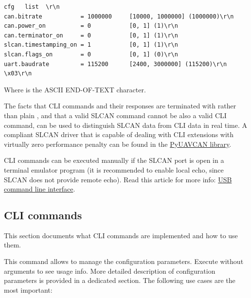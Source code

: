 \documentclass{zubaxdoc}
\begin{document}
\begin{verbatim}
cfg   list  \r\n
can.bitrate           = 1000000     [10000, 1000000] (1000000)\r\n
can.power_on          = 0           [0, 1] (1)\r\n
can.terminator_on     = 0           [0, 1] (1)\r\n
slcan.timestamping_on = 1           [0, 1] (1)\r\n
slcan.flags_on        = 0           [0, 1] (0)\r\n
uart.baudrate         = 115200      [2400, 3000000] (115200)\r\n
\x03\r\n
\end{verbatim}

Where  is the ASCII END-OF-TEXT character.

The facts that CLI commands and their responses are terminated with  rather than plain , and that a valid SLCAN command cannot be also a valid CLI command, can be used to distinguish SLCAN data from CLI data in real time. A compliant SLCAN driver that is capable of dealing with CLI extensions with virtually zero performance penalty can be found in the \href{http://uavcan.org/Implementations/Pyuavcan/}{PyUAVCAN library}.

CLI commands can be executed manually if the SLCAN port is open in a terminal emulator program (it is recommended to enable local echo, since SLCAN does not provide remote echo). Read this article for more info: \href{https://docs.zubax.com/usb}{USB command line interface}.
\clearpage
\subsection{CLI commands}

This section documents what CLI commands are implemented and how to use them.


This command allows to manage the configuration parameters. Execute without arguments to see usage info. More detailed description of configuration parameters is provided in a dedicated section. The following use cases are the most important:
\end{document}
